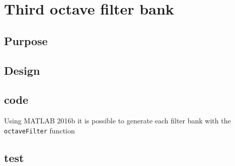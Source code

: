 \section{Third octave filter bank}


\subsection{Purpose}


\subsection{Design}


\subsection{code}

Using MATLAB 2016b it is possible to generate each filter bank with the \verb|octaveFilter| function


\subsection{test}

